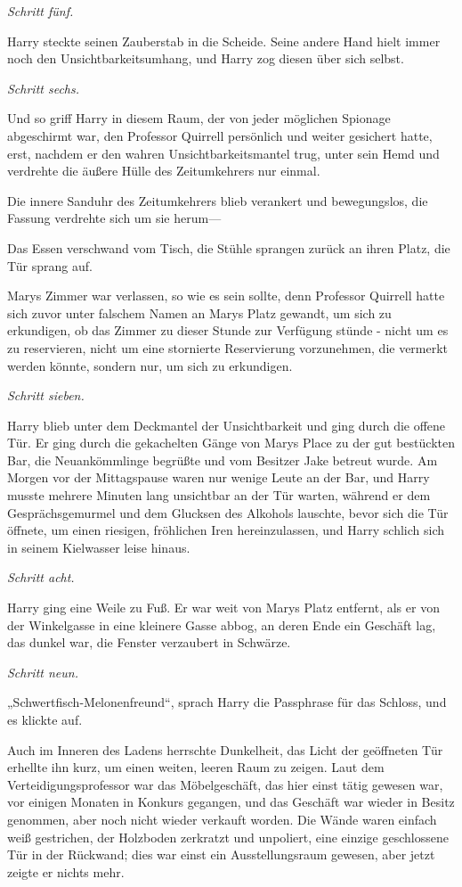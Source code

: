 {\emph{Schritt fünf.}

Harry steckte seinen Zauberstab in die Scheide. Seine andere Hand hielt immer noch den Unsichtbarkeitsumhang, und Harry zog diesen über sich selbst.

\emph{Schritt sechs.}

Und so griff Harry in diesem Raum, der von jeder möglichen Spionage abgeschirmt war, den Professor Quirrell persönlich und weiter gesichert hatte, erst, nachdem er den wahren Unsichtbarkeitsmantel trug, unter sein Hemd und verdrehte die äußere Hülle des Zeitumkehrers nur einmal.

Die innere Sanduhr des Zeitumkehrers blieb verankert und bewegungslos, die Fassung verdrehte sich um sie herum—

Das Essen verschwand vom Tisch, die Stühle sprangen zurück an ihren Platz, die Tür sprang auf.

Marys Zimmer war verlassen, so wie es sein sollte, denn Professor Quirrell hatte sich zuvor unter falschem Namen an Marys Platz gewandt, um sich zu erkundigen, ob das Zimmer zu dieser Stunde zur Verfügung stünde - nicht um es zu reservieren, nicht um eine stornierte Reservierung vorzunehmen, die vermerkt werden könnte, sondern nur, um sich zu erkundigen.

\emph{Schritt sieben.}

Harry blieb unter dem Deckmantel der Unsichtbarkeit und ging durch die offene Tür. Er ging durch die gekachelten Gänge von Marys Place zu der gut bestückten Bar, die Neuankömmlinge begrüßte und vom Besitzer Jake betreut wurde. Am Morgen vor der Mittagspause waren nur wenige Leute an der Bar, und Harry musste mehrere Minuten lang unsichtbar an der Tür warten, während er dem Gesprächsgemurmel und dem Glucksen des Alkohols lauschte, bevor sich die Tür öffnete, um einen riesigen, fröhlichen Iren hereinzulassen, und Harry schlich sich in seinem Kielwasser leise hinaus.

\emph{Schritt acht.}

Harry ging eine Weile zu Fuß. Er war weit von Marys Platz entfernt, als er von der Winkelgasse in eine kleinere Gasse abbog, an deren Ende ein Geschäft lag, das dunkel war, die Fenster verzaubert in Schwärze.

\emph{Schritt neun.}

„Schwertfisch-Melonenfreund“, sprach Harry die Passphrase für das Schloss, und es klickte auf.

Auch im Inneren des Ladens herrschte Dunkelheit, das Licht der geöffneten Tür erhellte ihn kurz, um einen weiten, leeren Raum zu zeigen. Laut dem Verteidigungsprofessor war das Möbelgeschäft, das hier einst tätig gewesen war, vor einigen Monaten in Konkurs gegangen, und das Geschäft war wieder in Besitz genommen, aber noch nicht wieder verkauft worden. Die Wände waren einfach weiß gestrichen, der Holzboden zerkratzt und unpoliert, eine einzige geschlossene Tür in der Rückwand; dies war einst ein Ausstellungsraum gewesen, aber jetzt zeigte er nichts mehr.

}
